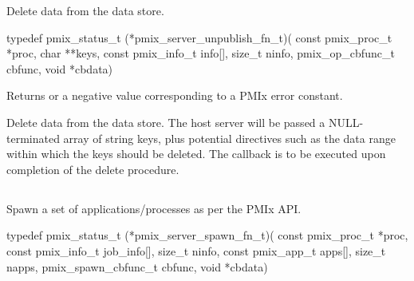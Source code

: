 \summary

Delete data from the data store.

\format

\cspecificstart
\begin{codepar}
typedef pmix_status_t (*pmix_server_unpublish_fn_t)(
                             const pmix_proc_t *proc, char **keys,
                             const pmix_info_t info[], size_t ninfo,
                             pmix_op_cbfunc_t cbfunc, void *cbdata)
\end{codepar}
\cspecificend

\begin{arglist}
\end{arglist}

Returns  or a negative value corresponding to a PMIx error constant.

\descr

Delete data from the data store.
The host server will be passed a NULL-terminated array of string keys, plus potential directives such as the data range within which the keys should be deleted.
The callback is to be executed upon completion of the delete procedure.


\subsection{}

\summary

Spawn a set of applications/processes as per the PMIx API.

\format

\cspecificstart
\begin{codepar}
typedef pmix_status_t (*pmix_server_spawn_fn_t)(
                             const pmix_proc_t *proc,
                             const pmix_info_t job_info[], size_t ninfo,
                             const pmix_app_t apps[], size_t napps,
                             pmix_spawn_cbfunc_t cbfunc, void *cbdata)
\end{codepar}
\cspecificend


